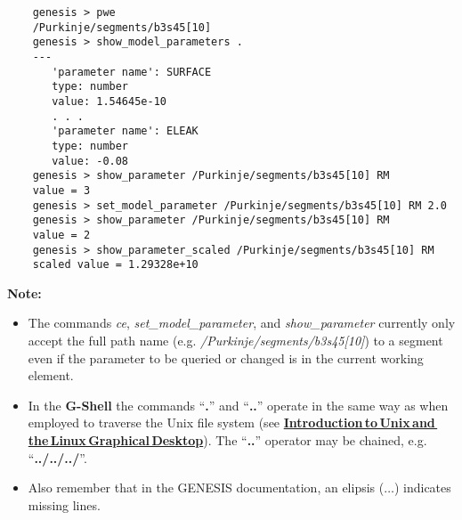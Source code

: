 \documentclass[12pt]{article}
\begin{document}
\begin{verbatim}
    genesis > pwe
    /Purkinje/segments/b3s45[10]
    genesis > show_model_parameters .
    ---
       'parameter name': SURFACE
       type: number
       value: 1.54645e-10
       . . .
       'parameter name': ELEAK
       type: number
       value: -0.08
    genesis > show_parameter /Purkinje/segments/b3s45[10] RM
    value = 3    
    genesis > set_model_parameter /Purkinje/segments/b3s45[10] RM 2.0
    genesis > show_parameter /Purkinje/segments/b3s45[10] RM
    value = 2
    genesis > show_parameter_scaled /Purkinje/segments/b3s45[10] RM
    scaled value = 1.29328e+10
\end{verbatim}

{\bf Note:}

\begin{itemize}
\item The commands {\it ce}, {\it set\_model\_parameter}, and {\it show\_parameter} currently only accept the full path name (e.g. {\it  /Purkinje/segments/b3s45[10]}) to a segment even if the parameter to be queried or changed is in the current working element. %

\item In the {\bf G-Shell} the commands ``{\bf .}'' and ``{\bf ..}'' operate in the same way as when employed to traverse the Unix file system (see \href{../unix-linux/unix-linux.tex}{\bf Introduction\,to\,Unix\,and\,the\,Linux\,Graphical\,Desktop}). The ``{\bf ..}'' operator may be chained, e.g. ``{\bf ../../../}''.

\item Also remember that in the GENESIS documentation, an elipsis ($\ldots$) indicates missing lines.

\end{itemize}
\end{document}
